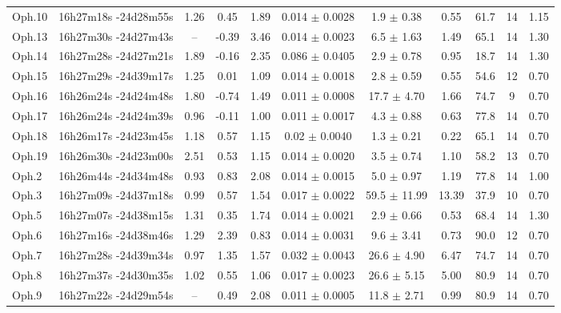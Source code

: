 \begin{table}[!h]
\begin{center}
\begin{longtable}{lcccccccccc}
Oph.10	&	16h27m18s -24d28m55s	&	1.26	&	0.45	&	1.89	&	0.014	$\pm$	0.0028	&	1.9	$\pm$	0.38	&	0.55	&	61.7	&	14	&	1.15	\\
Oph.13	&	16h27m30s -24d27m43s	&	--	&	-0.39	&	3.46	&	0.014	$\pm$	0.0023	&	6.5	$\pm$	1.63	&	1.49	&	65.1	&	14	&	1.30	\\
Oph.14	&	16h27m28s -24d27m21s	&	1.89	&	-0.16	&	2.35	&	0.086	$\pm$	0.0405	&	2.9	$\pm$	0.78	&	0.95	&	18.7	&	14	&	1.30	\\
Oph.15	&	16h27m29s -24d39m17s	&	1.25	&	0.01	&	1.09	&	0.014	$\pm$	0.0018	&	2.8	$\pm$	0.59	&	0.55	&	54.6	&	12	&	0.70	\\
Oph.16	&	16h26m24s -24d24m48s	&	1.80	&	-0.74	&	1.49	&	0.011	$\pm$	0.0008	&	17.7	$\pm$	4.70	&	1.66	&	74.7	&	9	&	0.70	\\
Oph.17	&	16h26m24s -24d24m39s	&	0.96	&	-0.11	&	1.00	&	0.011	$\pm$	0.0017	&	4.3	$\pm$	0.88	&	0.63	&	77.8	&	14	&	0.70	\\
Oph.18	&	16h26m17s -24d23m45s	&	1.18	&	0.57	&	1.15	&	0.02	$\pm$	0.0040	&	1.3	$\pm$	0.21	&	0.22	&	65.1	&	14	&	0.70	\\
Oph.19	&	16h26m30s -24d23m00s	&	2.51	&	0.53	&	1.15	&	0.014	$\pm$	0.0020	&	3.5	$\pm$	0.74	&	1.10	&	58.2	&	13	&	0.70	\\
Oph.2	&	16h26m44s -24d34m48s	&	0.93	&	0.83	&	2.08	&	0.014	$\pm$	0.0015	&	5.0	$\pm$	0.97	&	1.19	&	77.8	&	14	&	1.00	\\
Oph.3	&	16h27m09s -24d37m18s	&	0.99	&	0.57	&	1.54	&	0.017	$\pm$	0.0022	&	59.5	$\pm$	11.99	&	13.39	&	37.9	&	10	&	0.70	\\
Oph.5	&	16h27m07s -24d38m15s	&	1.31	&	0.35	&	1.74	&	0.014	$\pm$	0.0021	&	2.9	$\pm$	0.66	&	0.53	&	68.4	&	14	&	1.30	\\
Oph.6	&	16h27m16s -24d38m46s	&	1.29	&	2.39	&	0.83	&	0.014	$\pm$	0.0031	&	9.6	$\pm$	3.41	&	0.73	&	90.0	&	12	&	0.70	\\
Oph.7	&	16h27m28s -24d39m34s	&	0.97	&	1.35	&	1.57	&	0.032	$\pm$	0.0043	&	26.6	$\pm$	4.90	&	6.47	&	74.7	&	14	&	0.70	\\
Oph.8	&	16h27m37s -24d30m35s	&	1.02	&	0.55	&	1.06	&	0.017	$\pm$	0.0023	&	26.6	$\pm$	5.15	&	5.00	&	80.9	&	14	&	0.70	\\
Oph.9	&	16h27m22s -24d29m54s	&	--	&	0.49	&	2.08	&	0.011	$\pm$	0.0005	&	11.8	$\pm$	2.71	&	0.99	&	80.9	&	14	&	0.70	\\
\bottomrule																																															
\end{longtable}																																	
\end{center}																						
\end{table}	
						


